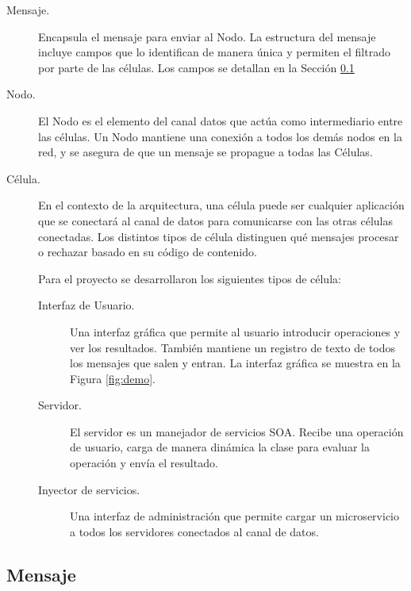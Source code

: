 \documentclass[conference,compsoc]{IEEEtran}
\begin{document}
\begin{description}
    \item[Mensaje.] Encapsula el mensaje para enviar al Nodo. La estructura del mensaje incluye campos que lo identifican de manera única y permiten el filtrado por parte de las células. Los campos se detallan en la Sección \ref{sec:msg}
    \item[Nodo.] El Nodo es el elemento del canal datos que actúa como intermediario entre las células. Un Nodo mantiene una conexión a todos los demás nodos en la red, y se asegura de que un mensaje se propague a todas las Células.
    \item[Célula.] En el contexto de la arquitectura, una célula puede ser cualquier aplicación que se conectará al canal de datos para comunicarse con las otras células conectadas. Los distintos tipos de célula distinguen qué mensajes procesar o rechazar basado en su código de contenido.
    
    Para el proyecto se desarrollaron los siguientes tipos de célula:
    \begin{description}
        \item[Interfaz de Usuario.] Una interfaz gráfica que permite al usuario introducir operaciones y ver los resultados. También mantiene un registro de texto de todos los mensajes que salen y entran. La interfaz gráfica se muestra en la Figura \ref{fig:demo}.
        \item[Servidor.] El servidor es un manejador de servicios SOA. Recibe una operación de usuario, carga de manera dinámica la clase para evaluar la operación y envía el resultado.
        \item[Inyector de servicios.] Una interfaz de administración que permite cargar un microservicio a todos los servidores conectados al canal de datos.
    \end{description}
\end{description}

\subsection{Mensaje}\label{sec:msg}
\end{document}
